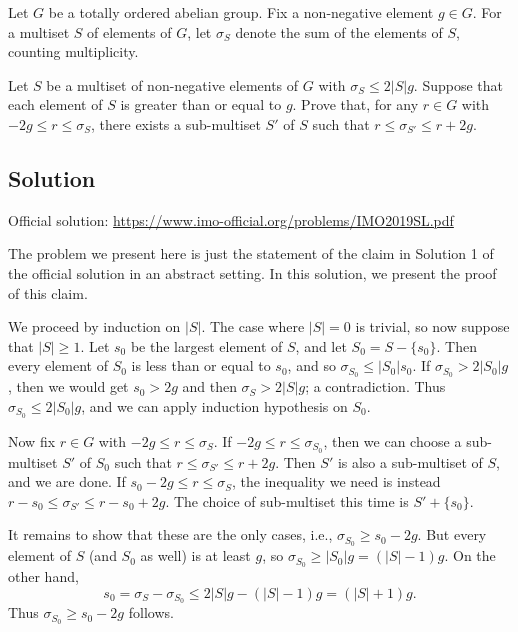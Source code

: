 Let $G$ be a totally ordered abelian group.
Fix a non-negative element $g \in G$.
For a multiset $S$ of elements of $G$, let $\sigma_S$ denote the sum of the elements of $S$, counting multiplicity.

Let $S$ be a multiset of non-negative elements of $G$ with $\sigma_S \leq 2|S| g$.
Suppose that each element of $S$ is greater than or equal to $g$.
Prove that, for any $r \in G$ with $-2g \leq r \leq \sigma_S$, there exists a sub-multiset $S'$ of $S$ such that $r \leq \sigma_{S'} \leq r + 2g$.



\subsection*{Solution}

Official solution: \url{https://www.imo-official.org/problems/IMO2019SL.pdf}

The problem we present here is just the statement of the claim in Solution 1 of the official solution in an abstract setting.
In this solution, we present the proof of this claim.

We proceed by induction on $|S|$.
The case where $|S| = 0$ is trivial, so now suppose that $|S| \geq 1$.
Let $s_0$ be the largest element of $S$, and let $S_0 = S - \{s_0\}$.
Then every element of $S_0$ is less than or equal to $s_0$, and so $\sigma_{S_0} \leq |S_0| s_0$.
If $\sigma_{S_0} > 2 |S_0| g$, then we would get $s_0 > 2g$ and then $\sigma_S > 2|S| g$; a contradiction.
Thus $\sigma_{S_0} \leq 2 |S_0| g$, and we can apply induction hypothesis on $S_0$.

Now fix $r \in G$ with $-2g \leq r \leq \sigma_S$.
If $-2g \leq r \leq \sigma_{S_0}$, then we can choose a sub-multiset $S'$ of $S_0$ such that $r \leq \sigma_{S'} \leq r + 2g$.
Then $S'$ is also a sub-multiset of $S$, and we are done.
If $s_0 - 2g \leq r \leq \sigma_S$, the inequality we need is instead $r - s_0 \leq \sigma_{S'} \leq r - s_0 + 2g$.
The choice of sub-multiset this time is $S' + \{s_0\}$.

It remains to show that these are the only cases, i.e., $\sigma_{S_0} \geq s_0 - 2g$.
But every element of $S$ (and $S_0$ as well) is at least $g$, so $\sigma_{S_0} \geq |S_0| g = (|S| - 1) g$.
On the other hand, \[ s_0 = \sigma_S - \sigma_{S_0} \leq 2|S| g - (|S| - 1) g = (|S| + 1) g. \]
Thus $\sigma_{S_0} \geq s_0 - 2g$ follows.
